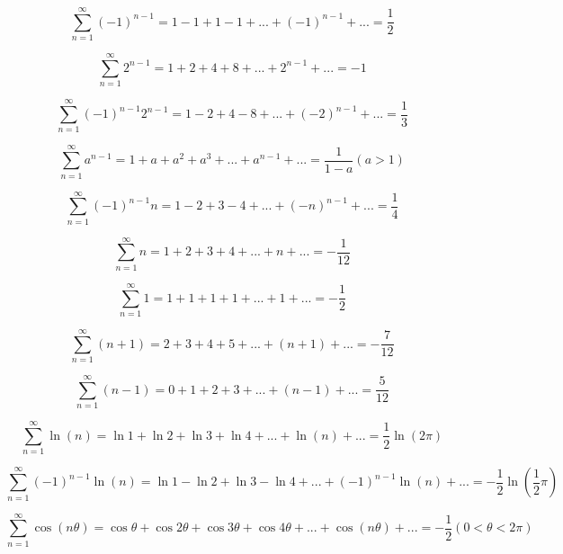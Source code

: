\documentclass[12pt]{article}
\begin{document}
\begin{equation}
\sum_{n=1}^{\infty} (-1)^{n-1} = 1-1+1-1+...+(-1)^{n-1}+... = \frac{1}{2}
\end{equation}

\begin{equation}
\sum_{n=1}^{\infty} 2^{n-1} = 1+2+4+8+...+2^{n-1}+... = -1
\end{equation}

\begin{equation}
\sum_{n=1}^{\infty} (-1)^{n-1} 2^{n-1} = 1-2+4-8+...+(-2)^{n-1}+... = \frac{1}{3}
\end{equation}

\begin{equation}
\sum_{n=1}^{\infty} a^{n-1} = 1+a+a^2+a^3+...+a^{n-1}+... = \frac{1}{1-a}(a>1)
\end{equation}

\begin{equation}
\sum_{n=1}^{\infty} (-1)^{n-1} n = 1-2+3-4+...+(-n)^{n-1}+... = \frac{1}{4}
\end{equation}

\begin{equation}
\sum_{n=1}^{\infty} n = 1+2+3+4+...+n+... = -\frac{1}{12}
\end{equation}

\begin{equation}
\sum_{n=1}^{\infty} 1 = 1+1+1+1+...+1+... = -\frac{1}{2}
\end{equation}

\begin{equation}
\sum_{n=1}^{\infty} (n+1) = 2+3+4+5+...+(n+1)+... = -\frac{7}{12}
\end{equation}

\begin{equation}
\sum_{n=1}^{\infty} (n-1) = 0+1+2+3+...+(n-1)+... = \frac{5}{12}
\end{equation}

\begin{equation}
\sum_{n=1}^{\infty} \ln(n) = \ln1+\ln2+\ln3+\ln4+...+\ln(n)+... = \frac{1}{2}\ln(2\pi)
\end{equation}

\begin{equation}
\sum_{n=1}^{\infty} (-1)^{n-1} \ln(n) = \ln1-\ln2+\ln3-\ln4+...+(-1)^{n-1}\ln(n)+... = -\frac{1}{2}\ln(\frac{1}{2}\pi)
\end{equation}

\begin{equation}
\sum_{n=1}^{\infty} \cos (n\theta) = \cos\theta+\cos2\theta+\cos3\theta+\cos4\theta+...+\cos (n\theta)+... = -\frac{1}{2} (0<\theta<2\pi)
\end{equation}
\end{document}
